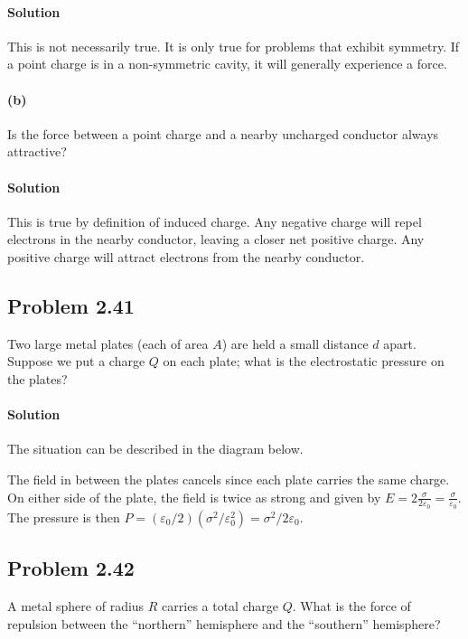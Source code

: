 \documentclass{article}
\begin{document}
\paragraph{Solution} This is not necessarily true. It is only true for problems that exhibit symmetry. If a point charge is in a non-symmetric cavity, it will generally experience a force.

\paragraph{(b)} Is the force between a point charge and a nearby uncharged conductor always attractive?

\paragraph{Solution} This is true by definition of induced charge. Any negative charge will repel electrons in the nearby conductor, leaving a closer net positive charge. Any positive charge will attract electrons from the nearby conductor.

\newpage

\subsection*{Problem 2.41}  Two large metal plates (each of area $A$) are held a small distance $d$ apart. Suppose we put a charge $Q$ on each plate; what is the electrostatic pressure on the plates?

\paragraph{Solution} The situation can be described in the diagram below. 
\medskip


The field in between the plates cancels since each plate carries the same charge. On either side of the plate, the field is twice as strong and given by $E = 2\frac{\sigma}{2\varepsilon_0} = \frac{\sigma}{\varepsilon_0}$. The pressure is then $P = (\varepsilon_0/2)(\sigma^2/\varepsilon_0^2) = \sigma^2/2\varepsilon_0$.

\newpage

\subsection*{Problem 2.42}
A metal sphere of radius $R$ carries a total charge $Q$. What is the force of repulsion between the “northern” hemisphere and the “southern” hemisphere?
\end{document}
